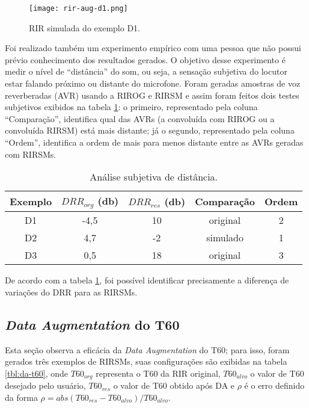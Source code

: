 \begin{figure} [H]
    \centering
    \texttt{[image: rir-aug-d1.png]}
    \caption{RIR simulada do exemplo D1.}
    \label{fig:rir-aug-d1}
\end{figure} 

Foi realizado também um experimento empírico com uma pessoa que não possui prévio conhecimento dos resultados gerados.
O objetivo desse experimento é medir o nível de “distância” do som, ou seja, a sensação subjetiva do locutor estar falando próximo ou distante
do microfone.
Foram geradas amostras de voz reverberadas (AVR) usando a RIROG e RIRSM e assim foram feitos dois testes subjetivos exibidos na tabela \ref{tbl:drr-exp}:
o primeiro, representado pela coluna “Comparação”, identifica qual das AVRs (a convoluída com RIROG ou a convoluída RIRSM) está mais distante;
já o segundo, representado pela coluna “Ordem”, identifica a ordem de mais para menos distante entre as AVRs geradas com RIRSMs.

\begin{table} [H]
    \centering
    \caption{Análise subjetiva de distância.}
    \label{tbl:drr-exp}
    \begin{tabular}{c|c|c|c|c}

        \textbf{Exemplo} & 
        \textbf{$DRR_{org}$ (db)} & 
        \textbf{$DRR_{res}$ (db)} & 
        \textbf{Comparação} &
        \textbf{Ordem} \\
        \hline 

        D1 & -4,5 & 10 & original & 2 \\
        D2 & 4,7 & -2 & simulado & 1 \\
        D3 & 0,5 & 18 & original & 3 \\

    \end{tabular}
\end{table}

De acordo com a tabela \ref{tbl:drr-exp}, foi possível identificar precisamente a diferença de variações do DRR para as RIRSMs.


\subsection{\textit{Data Augmentation} do T60}

Esta seção observa a eficácia da \textit{Data Augmentation} do T60; para isso, foram gerados três exemplos de RIRSMs, suas configurações
são exibidas na tabela \ref{tbl:da-t60}, onde $T60_{org}$ representa o T60 da RIR original, $T60_{alvo}$ o valor de T60 desejado pelo usuário,
$T60_{res}$ o valor de T60 obtido após DA e $\rho$ é o erro definido da forma $\rho = abs(T60_{res} - T60_{alvo})/T60_{alvo}$.

